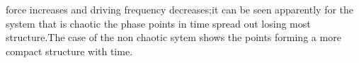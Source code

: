 \documentclass[11pt]{article} %
\begin{document}
force increases and driving frequency decreases;it can be seen apparently for the system that is chaotic the phase points in time spread out losing most structure.The case of the non chaotic sytem shows the points forming a more compact structure with time.
\end{document}

